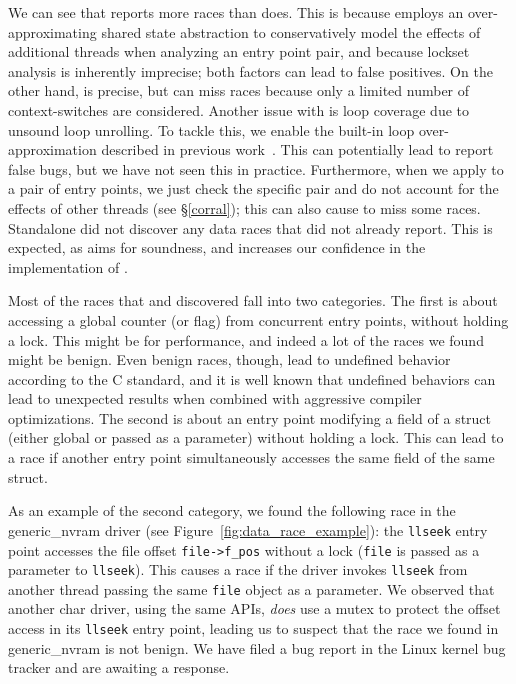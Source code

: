We can see that \whoop reports more races than \corral does. This is because \whoop employs an over-approximating shared state abstraction to conservatively model the effects of additional threads when analyzing an entry point pair, and because lockset analysis is inherently imprecise; both factors can lead to false positives.  On the other hand, \corral is precise, but can miss races because only a limited number of context-switches are considered.  Another issue with \corral is loop coverage due to unsound loop unrolling. To tackle this, we enable the built-in loop over-approximation described in previous work~\cite{lal2014powering}. This can potentially lead \corral to report false bugs, but we have not seen this in practice. Furthermore, when we apply \corral to a pair of entry points, we just check the specific pair and do not account for the effects of other threads (see \S\ref{corral}); this can also cause \corral to miss some races. Standalone \corral did not discover any data races that \whoop did not already report.  This is expected, as \whoop aims for soundness, and increases our confidence in the implementation of \whoop.

Most of the races that \whoop and \corral discovered fall into two categories. The first is about accessing a global counter (or flag) from concurrent entry points, without holding a lock. This might be for performance, and indeed a lot of the races we found might be benign. Even benign races, though, lead to undefined behavior according to the C standard, and it is well known that undefined behaviors can lead to unexpected results when combined with aggressive compiler optimizations. The second is about an entry point modifying a field of a struct (either global or passed as a parameter) without holding a lock. This can lead to a race if another entry point simultaneously accesses the same field of the same struct.

As an example of the second category, we found the following race in the generic\_nvram driver (see Figure~\ref{fig:data_race_example}): the \texttt{llseek} entry point accesses the file offset \texttt{file->f\_pos} without a lock (\texttt{file} is passed as a parameter to \texttt{llseek}). This causes a race if the driver invokes \texttt{llseek} from another thread passing the same \texttt{file} object as a parameter.  We observed that another char driver, using the same APIs, \emph{does} use a mutex to protect the offset access in its \texttt{llseek} entry point, leading us to suspect that the race we found in generic\_nvram is not benign.  We have filed a bug report in the Linux kernel bug tracker and are awaiting a response.

